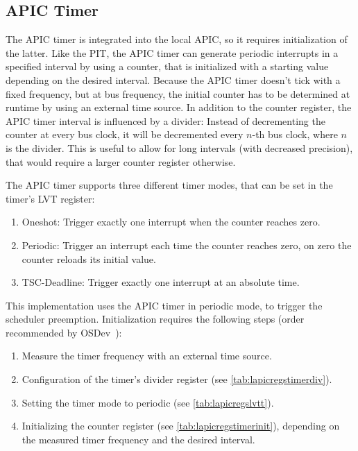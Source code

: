\subsection{APIC Timer}
\label{subsec:lapictimer}

The APIC timer is integrated into the local APIC, so it requires initialization of the latter. Like
the PIT, the APIC timer can generate periodic interrupts in a specified interval by using a
counter, that is initialized with a starting value depending on the desired interval. Because the
APIC timer doesn't tick with a fixed frequency, but at bus frequency, the initial counter has to be
determined at runtime by using an external time source. In addition to the counter register, the
APIC timer interval is influenced by a divider: Instead of decrementing the counter at every bus
clock, it will be decremented every \(n\)-th bus clock, where \(n\) is the divider. This is useful
to allow for long intervals (with decreased precision), that would require a larger counter
register otherwise.

The APIC timer supports three different timer modes, that can be set in the timer's LVT register:

\begin{enumerate}
  \item Oneshot: Trigger exactly one interrupt when the counter reaches zero.
  \item Periodic: Trigger an interrupt each time the counter reaches zero, on zero the counter reloads its
        initial value.
  \item TSC-Deadline: Trigger exactly one interrupt at an absolute time.
\end{enumerate}

This implementation uses the APIC timer in periodic mode, to trigger the scheduler preemption.
Initialization requires the following steps (order recommended by OSDev~\cite{osdev}):

\begin{enumerate}
  \item Measure the timer frequency with an external time source.
  \item Configuration of the timer's divider register (see \autoref{tab:lapicregstimerdiv}).
  \item Setting the timer mode to periodic (see \autoref{tab:lapicregslvtt}).
  \item Initializing the counter register (see \autoref{tab:lapicregstimerinit}), depending on the measured
        timer frequency and the desired interval.
\end{enumerate}

